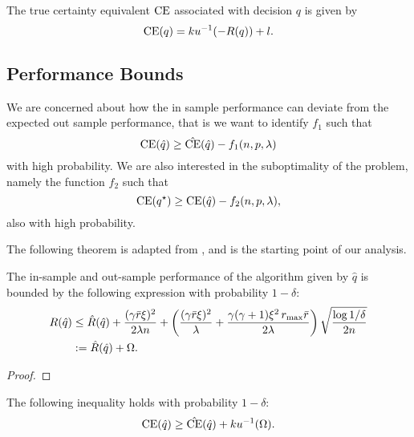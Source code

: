 
\begin{deff}
  The true certainty equivalent $\operatorname{CE}$ associated with decision $q$ is given by
  \[
    \operatorname{CE}(q) = ku^{-1}(-R(q)) + l.
  \]
\end{deff}

\subsection{Performance Bounds}

We are concerned about how the in sample performance can deviate from the expected out sample
performance, that is we want to identify $f_1$ such that
\[
  \operatorname{CE}(\hat q) \geq \hat{\operatorname{CE}}(\hat q) - f_1(n,p,\lambda)
\]
with high probability. We are also interested in the suboptimality of the problem, namely
the function $f_2$ such that
\[
  \operatorname{CE}(q^\star) \geq \operatorname{CE}(\hat q) - f_2(n,p,\lambda),
\]
also with high probability. 

The following theorem is adapted from \cite{bousquet2002stability}, and is the starting point of our
analysis. 

\begin{thm}
  \label{thm1}
  The in-sample and out-sample performance of the algorithm given by $\hat q$ is bounded
  by the following expression with probability $1-\delta$:
  \begin{align*}
    R(\hat q) &\leq \hat R(\hat q) + \frac{(\gamma\bar r\xi)^2}{2\lambda n} +
    \left(\frac{(\gamma\bar r\xi)^2}{\lambda} + \frac{\gamma(\gamma+1)\xi^2\,r_{\max}\bar
    r}{2\lambda}\right)\sqrt{\frac{\log 1/\delta}{2n}}\\
              &:= \hat R(\hat q) + \Omega.
  \end{align*}
\end{thm}

\begin{proof}
\end{proof}

\begin{thm}
  \label{thm2}
  The following inequality holds with probability $1-\delta$:
  \[
    \operatorname{CE}(\hat q) \geq \hat{\operatorname{CE}}(\hat q) + ku^{-1}(\Omega).
  \]
\end{thm}

